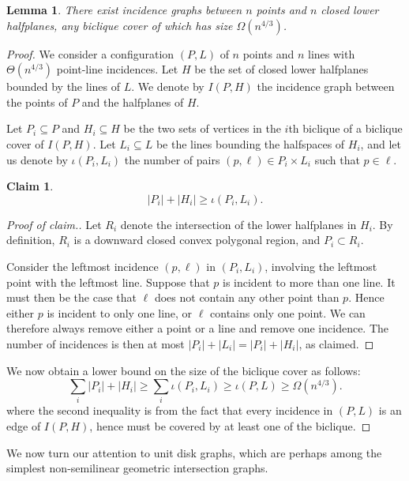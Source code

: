 \documentclass{amsart}
\newtheorem{lemma}[theorem]{Lemma}
\newtheorem{claim}{Claim}%
\begin{document}
\begin{lemma}
\label{lem:hplb}
There exist incidence graphs between $n$ points and $n$ closed lower halfplanes, any biclique cover of which has size 
$\Omega (n^{4/3})$.
\end{lemma}
\begin{proof}
We consider a configuration $(P,L)$ of $n$ points and $n$ lines with $\Theta(n^{4/3})$ point-line incidences.
Let $H$ be the set of closed lower halfplanes bounded by the lines of $L$. We denote by $I(P,H)$ the incidence graph between the points of $P$ and the halfplanes of $H$.

Let $P_i\subseteq P$ and $H_i\subseteq H$ be the two sets of vertices in the $i$th biclique of a biclique cover of $I(P,H)$. 
Let $L_i\subseteq L$ be the lines bounding the halfspaces of $H_i$, and let us denote by $\iota (P_i, L_i)$ the number of pairs $(p,\ell)\in P_i\times L_i$ such that $p\in\ell$.

\begin{claim}
    \[
    |P_i| + |H_i| \geq \iota (P_i, L_i).
    \]
\end{claim}
\begin{proof}[Proof of claim.]
    Let $R_i$ denote the intersection of the lower halfplanes in $H_i$. 
    By definition, $R_i$ is a downward closed convex polygonal region, and $P_i\subset R_i$.

    Consider the leftmost incidence $(p,\ell)$ in $(P_i,L_i)$, involving the leftmost point with the leftmost line. Suppose that $p$ is incident to more than one line. It must then be the case that $\ell$ does not contain any other point than $p$. Hence either $p$ is incident to only one line, or $\ell$ contains only one point. We can therefore always remove either a point or a line and remove one incidence. The number of incidences is then at most $|P_i|+|L_i| = |P_i|+|H_i|$, as claimed.
\end{proof}

We now obtain a lower bound on the size of the biclique cover as follows: 
\[ 
    \sum_i |P_i| + |H_i| \geq \sum_i \iota (P_i, L_i) \geq \iota (P, L) \geq \Omega (n^{4/3}).
\]
where the second inequality is from the fact that every incidence in $(P, L)$ is an edge of $I(P,H)$, hence must be covered by at least one of the biclique.
\end{proof}

We now turn our attention to unit disk graphs, which are perhaps among the simplest non-semilinear geometric intersection graphs.
\end{document}
